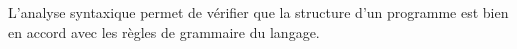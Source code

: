 L'analyse syntaxique permet de vérifier que la structure d'un programme est bien en accord avec les règles de grammaire du langage.
